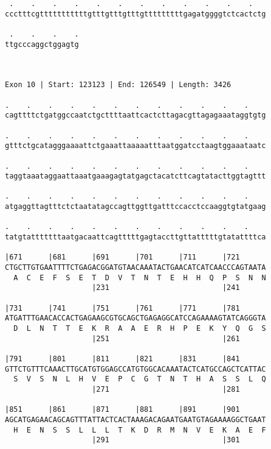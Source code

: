 \documentclass{article}
\begin{document}
\begin{Verbatim}
 .    .    .    .    .    .    .    .    .    .    .    .   
ccctttcgtttttttttttgtttgtttgtttgtttttttttgagatggggtctcactctg
                                                            
 .    .    .    .
ttgcccaggctggagtg
                 
                 
 
Exon 10 | Start: 123123 | End: 126549 | Length: 3426
 
.    .    .    .    .    .    .    .    .    .    .    .    
cagttttctgatggccaatctgcttttaattcactcttagacgttagagaaataggtgtg
                                                            
.    .    .    .    .    .    .    .    .    .    .    .    
gtttctgcatagggaaaattctgaaattaaaaatttaatggatcctaagtggaaataatc
                                                            
.    .    .    .    .    .    .    .    .    .    .    .    
taggtaaataggaattaaatgaaagagtatgagctacatcttcagtatacttggtagttt
                                                            
.    .    .    .    .    .    .    .    .    .    .    .    
atgaggttagtttctctaatatagccagttggttgatttccacctccaaggtgtatgaag
                                                            
.    .    .    .    .    .    .    .    .    .    .    .    
tatgtatttttttaatgacaattcagtttttgagtaccttgttatttttgtatattttca
                                                            
|671      |681      |691      |701      |711      |721      
CTGCTTGTGAATTTTCTGAGACGGATGTAACAAATACTGAACATCATCAACCCAGTAATA
  A  C  E  F  S  E  T  D  V  T  N  T  E  H  H  Q  P  S  N  N
                    |231                          |241      
  
|731      |741      |751      |761      |771      |781      
ATGATTTGAACACCACTGAGAAGCGTGCAGCTGAGAGGCATCCAGAAAAGTATCAGGGTA
  D  L  N  T  T  E  K  R  A  A  E  R  H  P  E  K  Y  Q  G  S
                    |251                          |261      
  
|791      |801      |811      |821      |831      |841      
GTTCTGTTTCAAACTTGCATGTGGAGCCATGTGGCACAAATACTCATGCCAGCTCATTAC
  S  V  S  N  L  H  V  E  P  C  G  T  N  T  H  A  S  S  L  Q
                    |271                          |281      
  
|851      |861      |871      |881      |891      |901      
AGCATGAGAACAGCAGTTTATTACTCACTAAAGACAGAATGAATGTAGAAAAGGCTGAAT
  H  E  N  S  S  L  L  L  T  K  D  R  M  N  V  E  K  A  E  F
                    |291                          |301      
  

\end{Verbatim}
\end{document}
